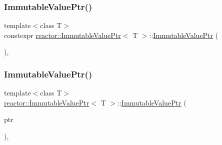 \mbox{\label{classreactor_1_1ImmutableValuePtr_aec3f1f481dc495293453c32f8654b5bc}} 
\subsubsection{\texorpdfstring{Immutable\+Value\+Ptr()}{ImmutableValuePtr()}\hspace{0.1cm}{\footnotesize\ttfamily [5/6]}}
{\footnotesize\ttfamily template$<$class T$>$ \\
constexpr \hyperlink{classreactor_1_1ImmutableValuePtr}{reactor\+::\+Immutable\+Value\+Ptr}$<$ T $>$\+::\hyperlink{classreactor_1_1ImmutableValuePtr}{Immutable\+Value\+Ptr} (\begin{DoxyParamCaption}\item[{std\+::nullptr\+\_\+t}]{ }\end{DoxyParamCaption})\hspace{0.3cm}{\ttfamily [inline]}, {\ttfamily [explicit]}}

\mbox{\label{classreactor_1_1ImmutableValuePtr_a7b1b937ccd6dd4875c3737ba2780019f}} 
\subsubsection{\texorpdfstring{Immutable\+Value\+Ptr()}{ImmutableValuePtr()}\hspace{0.1cm}{\footnotesize\ttfamily [6/6]}}
{\footnotesize\ttfamily template$<$class T$>$ \\
\hyperlink{classreactor_1_1ImmutableValuePtr}{reactor\+::\+Immutable\+Value\+Ptr}$<$ T $>$\+::\hyperlink{classreactor_1_1ImmutableValuePtr}{Immutable\+Value\+Ptr} (\begin{DoxyParamCaption}\item[{\hyperlink{classreactor_1_1MutableValuePtr}{Mutable\+Value\+Ptr}$<$ T $>$ \&\&}]{ptr }\end{DoxyParamCaption})\hspace{0.3cm}{\ttfamily [inline]}, {\ttfamily [explicit]}}



